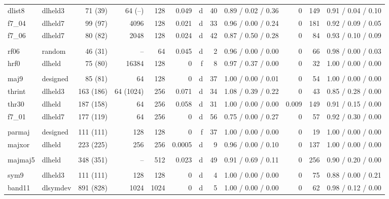 \begin{tabular}{@{}llrrrrrrcrrc@{}}
dlist8 & dlheld3 & 71 (39) & 64 (--) & 128 & 0.049 & d & 40 & 0.89 / 0.02 / 0.36 & 0 & 149 & 0.91 / 0.04 / 0.10\\
f7\_04 & dlheld7 & 99 (97) & 4096 & 128 & 0.021 & d & 33 & 0.96 / 0.00 / 0.24 & 0 & 181 & 0.92 / 0.09 / 0.05\\
f7\_06 & dlheld7 & 80 (82) & 2048 & 128 & 0.024 & d & 42 & 0.87 / 0.50 / 0.28 & 0 & 84 & 0.93 / 0.10 / 0.09\\
\addlinespace[2pt]
\multicolumn{12}{@{}l}{\emph{Random formulas}}\\
rf06 & random & 46 (31) & -- & 64 & 0.045 & d & 2 & 0.96 / 0.00 / 0.00 & 0 & 66 & 0.98 / 0.00 / 0.03\\
hrf0 & dlheld & 75 (80) & 16384 & 128 & 0 & f & 8 & 0.97 / 0.37 / 0.00 & 0 & 32 & 1.00 / 0.00 / 0.00\\
\addlinespace[2pt]
\multicolumn{12}{@{}l}{\emph{Majorities and halfspaces}}\\
maj9 & designed & 85 (81) & 64 & 128 & 0 & d & 37 & 1.00 / 0.00 / 0.01 & 0 & 54 & 1.00 / 0.00 / 0.00\\
thrint & dlheld3 & 163 (186) & 64 (1024) & 256 & 0.071 & d & 34 & 1.08 / 0.39 / 0.22 & 0 & 43 & 0.85 / 0.28 / 0.00\\
thr30 & dlheld & 187 (158) & 64 & 256 & 0.058 & d & 31 & 1.00 / 0.00 / 0.00 & 0.009 & 149 & 0.91 / 0.15 / 0.00\\
f7\_01 & dlheld7 & 177 (119) & 64 & 256 & 0 & d & 56 & 0.75 / 0.00 / 0.27 & 0 & 57 & 0.92 / 0.30 / 0.00\\
\addlinespace[2pt]
\multicolumn{12}{@{}l}{\emph{Parities of two majorities}}\\
parmaj & designed & 111 (111) & 128 & 128 & 0 & f & 37 & 1.00 / 0.00 / 0.00 & 0 & 19 & 1.00 / 0.00 / 0.00\\
majxor & dlheld & 223 (225) & 256 & 256 & 0.0005 & d & 9 & 0.96 / 0.00 / 0.10 & 0 & 137 & 1.00 / 0.00 / 0.00\\
\addlinespace[2pt]
\multicolumn{12}{@{}l}{\emph{Majority of majorities}}\\
majmaj5 & dlheld & 348 (351) & -- & 512 & 0.023 & d & 49 & 0.91 / 0.69 / 0.11 & 0 & 256 & 0.90 / 0.20 / 0.00\\
\addlinespace[2pt]
\multicolumn{12}{@{}l}{\emph{Symmetric and signed sums}}\\
sym9 & dlheld3 & 111 (111) & 128 & 128 & 0 & d & 4 & 1.00 / 0.00 / 0.00 & 0 & 75 & 0.88 / 0.00 / 0.21\\
band11 & dlsymdev & 891 (828) & 1024 & 1024 & 0 & d & 5 & 1.00 / 0.00 / 0.00 & 0 & 62 & 0.98 / 0.12 / 0.00\\

\end{tabular}
